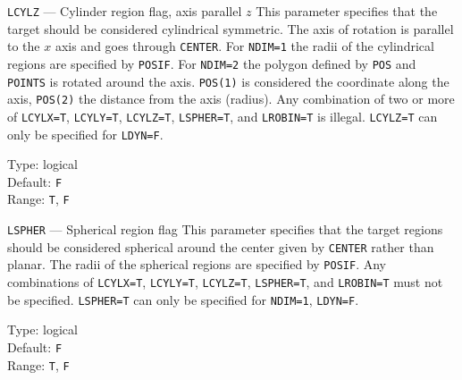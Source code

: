 \begin{keydescription}{\texttt{LCYLZ} --- Cylinder region flag, axis parallel $z$}
%
  This parameter specifies that the target should be considered cylindrical 
  symmetric. The axis of rotation is parallel to the $x$ axis and goes through 
  \texttt{CENTER}. For \texttt{NDIM=1} the radii of the 
  cylindrical regions are specified by \texttt{POSIF}. For \texttt{NDIM=2}
  the polygon defined by \texttt{POS} and \texttt{POINTS} is rotated around 
  the axis. \texttt{POS(1)} is considered the coordinate along the axis, 
  \texttt{POS(2)} the distance from the axis (radius). Any combination of two
  or more of \texttt{LCYLX=T}, \texttt{LCYLY=T}, \texttt{LCYLZ=T}, 
  \texttt{LSPHER=T}, and \texttt{LROBIN=T} is illegal. 
  \texttt{LCYLZ=T} can only be specified for \texttt{LDYN=F}.
  \begin{keytab}
    Type:    \> logical \\
    Default: \> \texttt{F} \\
    Range:   \> \texttt{T}, \texttt{F} 
  \end{keytab}
\end{keydescription}

\begin{keydescription}{\texttt{LSPHER} --- Spherical region flag}
%
  This parameter specifies that the target regions should be
  considered spherical around the center given by \texttt{CENTER} rather than 
  planar. The radii of the spherical regions are specified by \texttt{POSIF}. 
  Any combinations of \texttt{LCYLX=T}, \texttt{LCYLY=T}, \texttt{LCYLZ=T}, 
  \texttt{LSPHER=T}, and \texttt{LROBIN=T} must not be specified. 
  \texttt{LSPHER=T} can only be specified for \texttt{NDIM=1}, \texttt{LDYN=F}.
  \begin{keytab}
    Type:    \> logical \\
    Default: \> \texttt{F} \\
    Range:   \> \texttt{T}, \texttt{F} 
  \end{keytab}
\end{keydescription}

